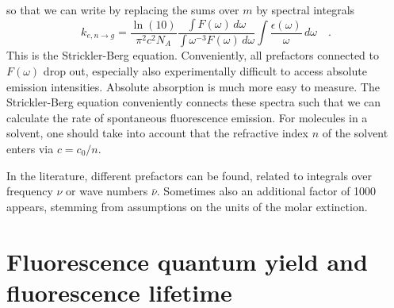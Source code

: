 so that we can write by replacing the sums over $m$ by  spectral integrals
\begin{equation}
 k_{e,n \rightarrow g}  =  \frac{\ln(10)}{\pi^2 c^2 N_A} \frac{\int F(\omega) \, d \omega}{\int \omega^{-3} F(\omega) \, d \omega }
 \int \frac{\epsilon(\omega)}{\omega} \, d \omega   \quad. 
\end{equation}
This is the Strickler-Berg equation. Conveniently, all prefactors connected to $F(\omega)$ drop out, especially also experimentally difficult to access absolute emission intensities. Absolute absorption is much more easy to measure. The Strickler-Berg equation conveniently connects these spectra such that we can calculate the rate of spontaneous fluorescence emission. For molecules in a solvent, one should take into account that the refractive index $n$ of the solvent enters via $c = c_0 / n$. 

In the literature, different prefactors can be found, related to integrals over frequency $\nu$ or wave numbers $\bar{\nu}$. Sometimes also an additional factor of 1000 appears, stemming from assumptions on the units of the molar extinction.














\section{Fluorescence quantum yield and fluorescence lifetime} 





